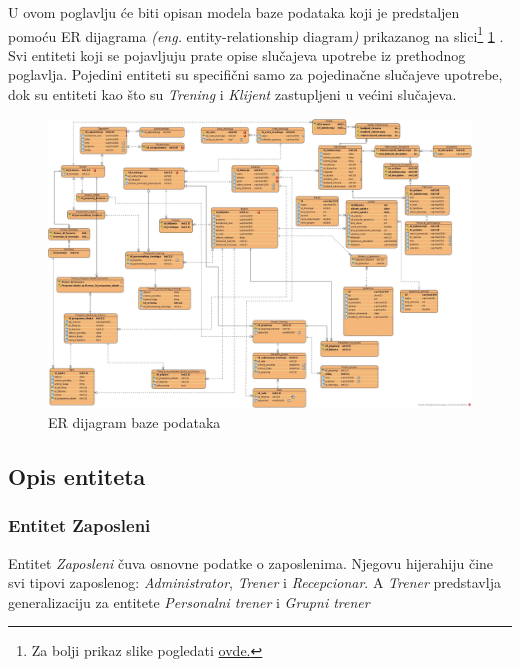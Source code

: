 \documentclass[../main.tex]{subfiles}
\begin{document}
U ovom poglavlju će biti opisan modela baze podataka koji je predstaljen pomoću ER dijagrama \textit{(eng.} entity-relationship diagram\textit{)} prikazanog na slici\footnote{Za bolji prikaz slike pogledati \href{https://github.com/jovanape/Informacioni-sistem-za-teretane/blob/main/Dijagrami/jpg_fajlovi/EER\%20dijagram\%20baze\%20podataka\%20-\%20novo\%202.jpg}{ovde.} } \ref{fig:baza} . Svi entiteti koji se pojavljuju prate opise slučajeva upotrebe iz prethodnog poglavlja. Pojedini entiteti su specifični samo za pojedinačne slučajeve upotrebe, dok su entiteti kao što su \textit{Trening} i \textit{Klijent} zastupljeni u većini slučajeva. 


\begin{figure}[!ht]
\begin{center}
\includegraphics[scale=0.20]{sections/images/EER dijagram baze podataka - novo 2.jpg}
\end{center}
\caption{ER dijagram baze podataka}
\label{fig:baza}
\end{figure}

\subsection{Opis entiteta}


\subsubsection{Entitet Zaposleni}

Entitet \textit{Zaposleni} čuva osnovne podatke o zaposlenima. Njegovu hijerahiju čine svi tipovi zaposlenog: \textit{Administrator}, \textit{Trener} i \textit{Recepcionar}. A \textit{Trener} predstavlja generalizaciju za entitete \textit{Personalni trener} i \textit{Grupni trener}
\end{document}

